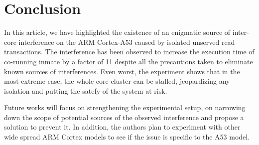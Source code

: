 \section{Conclusion}
    In this article, we have highlighted the existence of an enigmatic source of inter-core interference on the ARM Cortex-A53 caused by isolated unserved read transactions.
    The interference has been observed to increase the execution time of co-running inmate by a factor of 11 despite all the precautions taken to eliminate known sources of interferences.
    Even worst, the experiment shows that in the most extreme case, the whole core cluster can be stalled, jeopardizing any isolation and putting the satefy of the system at risk.

    Future works will focus on strengthening the experimental setup, on narrowing down the scope of potential sources of the observed interference and propose a solution to prevent it. In addition, the authors plan to experiment with other wide spread ARM Cortex models to see if the issue is specific to the A53 model.
